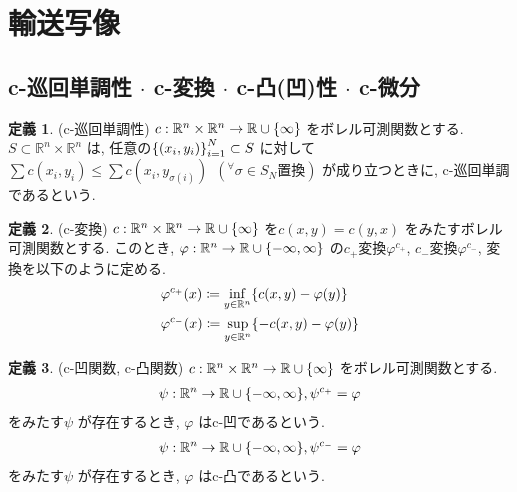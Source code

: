 \documentclass[10pt, fleqn, label-section=none, titlepage]{bxjsarticle}
\theoremstyle{definition}
\newtheorem{dfn}{定義}[section]
\newcommand{\any}{{}^{\forall}}
\newcommand{\cbra}[1]{\mleft\{#1\mright\}}
\renewcommand{\;}{\, ; \,}
\begin{document}
\newpage
\section{輸送写像}
\subsection{c-巡回単調性 $\cdot$ c-変換 $\cdot$ c-凸(凹)性 $\cdot$ c-微分}

\begin{dfn}(c-巡回単調性)
$c:\mathbb R ^n \times \mathbb R ^n \rightarrow \mathbb R \cup \cbra{\infty}$ をボレル可測関数とする. $S \subset \mathbb R ^n \times \mathbb R ^n $ は, 任意の$\cbra{(x_i, y_i)}_{i=1}^N \subset S$ に対して$\sum c(x_i, y_i) \leq \sum c(x_i, y_{\sigma(i)}) \,\,\, (\any \sigma \in S_N \text{置換})$ が成り立つときに, c-巡回単調であるという.  
\end{dfn}

\begin{dfn}(c-変換)
$c:\mathbb R ^n \times \mathbb R ^n \rightarrow \mathbb R \cup \cbra{\infty}$ を$c(x,y) = c(y,x)$ をみたすボレル可測関数とする. このとき, $\varphi: \mathbb R ^n \rightarrow \mathbb R \cup \cbra{-\infty, \infty}$ の$c_{+}$変換$\varphi^{c_+}$, $c_{-}$変換$\varphi^{c_-}$, 変換を以下のように定める. 
\begin{align*} &\varphi^{c_+}(x) \coloneqq \inf_{y \in \mathbb R ^n} \cbra{c(x,y) - \varphi (y)} \\
 &\varphi^{c_-}(x) \coloneqq \sup_{y \in \mathbb R ^n} \cbra{-c(x,y) - \varphi (y)} \end{align*}
\end{dfn}

\begin{dfn}(c-凹関数, c-凸関数)
$c:\mathbb R ^n \times \mathbb R ^n \rightarrow \mathbb R \cup \cbra{\infty}$ をボレル可測関数とする.
\begin{align*} \psi : \mathbb R^n \rightarrow \mathbb R \cup \cbra{-\infty, \infty}, \psi^{c_+} = \varphi \end{align*}
をみたす$\psi$ が存在するとき, $\varphi$ はc-凹であるという. 
\begin{align*} \psi : \mathbb R^n \rightarrow \mathbb R \cup \cbra{-\infty, \infty}, \psi^{c_-} = \varphi \end{align*}
をみたす$\psi$ が存在するとき, $\varphi$ はc-凸であるという. 
\end{dfn}
\end{document}
